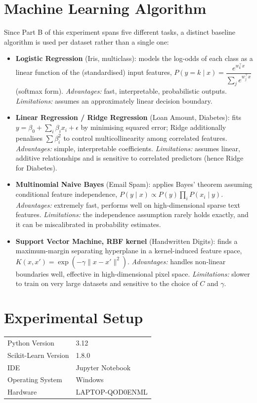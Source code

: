 \documentclass[12pt,a4paper]{article}
\begin{document}
\section{Machine Learning Algorithm}
Since Part B of this experiment spans five different tasks, a distinct baseline algorithm is
used per dataset rather than a single one:

\begin{itemize}
\item \textbf{Logistic Regression} (Iris, multiclass): models the log-odds of each class as a
linear function of the (standardised) input features, $P(y=k\mid x)=\dfrac{e^{w_k^\top
x}}{\sum_j e^{w_j^\top x}}$ (softmax form). \textit{Advantages:} fast, interpretable,
probabilistic outputs. \textit{Limitations:} assumes an approximately linear decision boundary.
\item \textbf{Linear Regression / Ridge Regression} (Loan Amount, Diabetes): fits
$y=\beta_0+\sum_i \beta_i x_i+\epsilon$ by minimising squared error; Ridge additionally penalises
$\sum \beta_i^2$ to control multicollinearity among correlated features.
\textit{Advantages:} simple, interpretable coefficients. \textit{Limitations:} assumes linear,
additive relationships and is sensitive to correlated predictors (hence Ridge for Diabetes).
\item \textbf{Multinomial Naive Bayes} (Email Spam): applies Bayes' theorem assuming conditional
feature independence, $P(y\mid x)\propto P(y)\prod_i P(x_i\mid y)$. \textit{Advantages:} extremely
fast, performs well on high-dimensional sparse text features. \textit{Limitations:} the
independence assumption rarely holds exactly, and it can be miscalibrated in probability
estimates.
\item \textbf{Support Vector Machine, RBF kernel} (Handwritten Digits): finds a maximum-margin
separating hyperplane in a kernel-induced feature space, $K(x,x')=\exp(-\gamma\lVert x-x'
\rVert^2)$. \textit{Advantages:} handles non-linear boundaries well, effective in
high-dimensional pixel space. \textit{Limitations:} slower to train on very large datasets and
sensitive to the choice of $C$ and $\gamma$.
\end{itemize}

\section{Experimental Setup}
\begin{tabular}{ll}
\toprule
Python Version & 3.12 \\
Scikit-Learn Version & 1.8.0 \\
IDE & Jupyter Notebook \\
Operating System & Windows\\
Hardware & LAPTOP-QOD0ENML \\
\bottomrule
\end{tabular}
\end{document}
